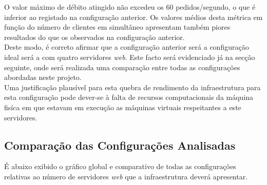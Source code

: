 O valor máximo de débito atingido não excedeu os $60$ pedidos/segundo, o que é inferior ao registado na configuração anterior.
Os valores médios desta métrica em função do número de clientes em simultâneo apresentam também piores resultados do que os observados na configuração anterior. \\

Deste modo, é correto afirmar que a configuração anterior será a configuração ideal será a com quatro servidores \textit{web}.
Este facto será evidenciado já na secção seguinte, onde será realizada uma comparação entre todas as configurações abordadas neste projeto. \\

Uma justificação plausível para esta quebra de rendimento da infraestrutura para esta configuração pode dever-se à falta de recursos computacionais da máquina fisíca em que estavam em execução as máquinas virtuais respeitantes a este servidores.

\subsection{Comparação das Configurações Analisadas}

É abaixo exibido o gráfico global e comparativo de todas as configurações relativas ao número de servidores \textit{web} que a infraestrutura deverá apresentar.
